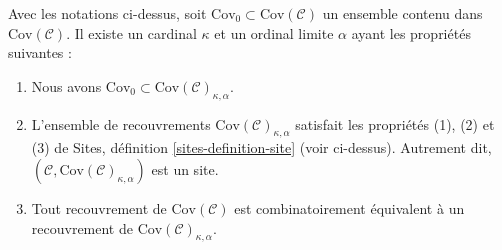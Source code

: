 \begin{lemma}
\label{lemma-coverings-site}
Avec les notations ci-dessus, soit
$\text{Cov}_0 \subset \text{Cov}(\mathcal{C})$ un ensemble contenu dans
$\text{Cov}(\mathcal{C})$.
Il existe un cardinal $\kappa$ et un ordinal limite $\alpha$ ayant les
propriétés suivantes :
\begin{enumerate}
\item Nous avons
$\text{Cov}_0 \subset \text{Cov}(\mathcal{C})_{\kappa, \alpha}$.
\item L'ensemble de recouvrements
$\text{Cov}(\mathcal{C})_{\kappa, \alpha}$ satisfait les propriétés (1), (2)
et (3) de Sites, définition \ref{sites-definition-site} (voir ci-dessus).
Autrement dit, $(\mathcal{C}, \text{Cov}(\mathcal{C})_{\kappa, \alpha})$
est un site.
\item Tout recouvrement de $\text{Cov}(\mathcal{C})$ est combinatoirement
équivalent à un recouvrement de
$\text{Cov}(\mathcal{C})_{\kappa, \alpha}$.
\end{enumerate}
\end{lemma}

